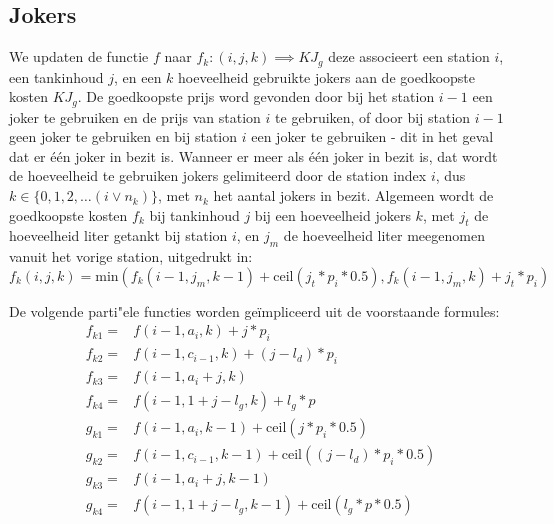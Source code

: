 \documentclass[10pt,tikz]{article}
\begin{document}
\subsection*{Jokers}
We updaten de functie $f$ naar $f_k: (i,j,k) \implies KJ_g$ deze associeert een station $i$, een tankinhoud $j$, en een $k$ hoeveelheid gebruikte jokers aan de goedkoopste kosten $KJ_g$.
De goedkoopste prijs word gevonden door bij het station $i-1$ een joker te gebruiken en de prijs van station $i$ te gebruiken, of door bij station $i-1$ geen joker te gebruiken en bij station $i$ een joker te gebruiken
- dit in het geval dat er \'e\'en joker in bezit is.
Wanneer er meer als \'e\'en joker in bezit is, dat wordt de hoeveelheid te gebruiken jokers gelimiteerd door de station index $i$,
dus $k \in  \{0, 1, 2, \ldots (i \lor n_k) \}$, met $n_k$ het aantal jokers in bezit.
Algemeen wordt de goedkoopste kosten $f_k$ bij tankinhoud $j$ bij een hoeveelheid jokers $k$, met $j_t$ de hoeveelheid liter getankt bij station $i$, en $j_m$ de hoeveelheid liter meegenomen vanuit het vorige station, uitgedrukt in:
\begin{equation}
	f_k(i,j,k) = \text{min}(f_k(i-1,j_m,k-1) + \text{ceil}(j_t * p_i * 0.5), f_k(i-1,j_m,k) + j_t * p_i)
\end{equation}

De volgende parti"ele functies worden ge\"impliceerd uit de voorstaande formules:
\begin{equation}
	\begin{aligned}
		f_{k1}  = & f(i-1, a_i, k) + j * p_i                                    \\
		f_{k2}  = & f(i-1, c_{i-1}, k) + (j - l_d) * p_i                        \\
		f_{k3}  = & f(i-1,  a_i + j, k)                                         \\
		f_{k4}  = & f(i-1, 1 + j - l_g, k) + l_g * p                            \\
		g_{k1}  = & f(i-1,  a_i, k - 1) +  \text{ceil}(j * p_i * 0.5)           \\
		g_{k2}  = & f(i-1, c_{i-1}, k - 1) + \text{ceil}((j - l_d) * p_i * 0.5) \\
		g_{k3}  = & f(i-1,  a_i + j, k - 1)                                     \\
		g_{k4}  = & f(i-1, 1 + j - l_g, k - 1) + \text{ceil}(l_g * p * 0.5)     \\
	\end{aligned}
	\label{eq:partiele_functies_jokers}
\end{equation}
\end{document}
